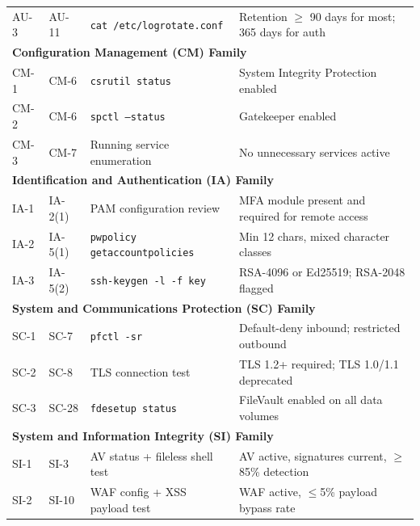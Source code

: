 \documentclass[12pt,oneside]{report}
\begin{document}
\begin{longtable}{|p{1.2cm}|p{1.8cm}|p{3.5cm}|p{4.5cm}|}
AU-3 & AU-11 & \texttt{cat /etc/logrotate.conf} & Retention $\geq$ 90 days for most; 365 days for auth \\[8pt]
\multicolumn{4}{l}{\textbf{Configuration Management (CM) Family}} \\[4pt]
CM-1 & CM-6 & \texttt{csrutil status} & System Integrity Protection enabled \\
CM-2 & CM-6 & \texttt{spctl --status} & Gatekeeper enabled \\
CM-3 & CM-7 & Running service enumeration & No unnecessary services active \\[8pt]
\multicolumn{4}{l}{\textbf{Identification and Authentication (IA) Family}} \\[4pt]
IA-1 & IA-2(1) & PAM configuration review & MFA module present and required for remote access \\
IA-2 & IA-5(1) & \texttt{pwpolicy getaccountpolicies} & Min 12 chars, mixed character classes \\
IA-3 & IA-5(2) & \texttt{ssh-keygen -l -f key} & RSA-4096 or Ed25519; RSA-2048 flagged \\[8pt]
\multicolumn{4}{l}{\textbf{System and Communications Protection (SC) Family}} \\[4pt]
SC-1 & SC-7 & \texttt{pfctl -sr} & Default-deny inbound; restricted outbound \\
SC-2 & SC-8 & TLS connection test & TLS 1.2+ required; TLS 1.0/1.1 deprecated \\
SC-3 & SC-28 & \texttt{fdesetup status} & FileVault enabled on all data volumes \\[8pt]
\multicolumn{4}{l}{\textbf{System and Information Integrity (SI) Family}} \\[4pt]
SI-1 & SI-3 & AV status + fileless shell test & AV active, signatures current, $\geq$85\% detection \\
SI-2 & SI-10 & WAF config + XSS payload test & WAF active, $\leq$5\% payload bypass rate \\
\hline
\end{longtable}
\end{document}
